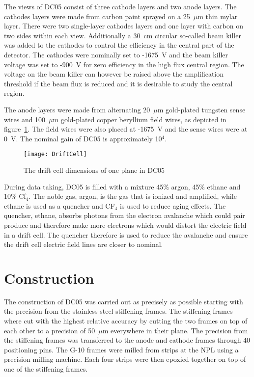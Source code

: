 The views of DC05 consist of three cathode layers and two anode layers.  The
cathodes layers were made from carbon paint sprayed on a 25~$\mu$m thin mylar
layer.  There were two single-layer cathodes layers and one layer with carbon on
two sides within each view.  Additionally a 30~cm circular so-called beam killer
was added to the cathodes to control the efficiency in the central part of the
detector.  The cathodes were nominally set to -1675~V and the beam killer
voltage was set to -900~V for zero efficiency in the high flux central region.
The voltage on the beam killer can however be raised above the amplification
threshold if the beam flux is reduced and it is desirable to study the central
region.

The anode layers were made from alternating 20~$\mu$m gold-plated tungsten sense
wires and 100~$\mu$m gold-plated copper beryllium field wires, as depicted in
figure~\ref{fig:driftcell}.  The field wires were also placed at -1675~V and the
sense wires were at 0~V.  The nominal gain of DC05 is approximately 10$^4$.

\begin{figure}
  \centering \texttt{[image: DriftCell]}
  \caption{}{The drift cell dimensions of one plane in DC05}
  \label{fig:driftcell}%
\end{figure}

During data taking, DC05 is filled with a mixture 45\% argon, 45\% ethane and
10\% Cf$_4$.  The noble gas, argon, is the gas that is ionized and amplified,
while ethane is used as a quencher and CF$_4$ is used to reduce aging effects.
The quencher, ethane, absorbs photons from the electron avalanche which could
pair produce and therefore make more electrons which would distort the electric
field in a drift cell.  The quencher therefore is used to reduce the avalanche
and ensure the drift cell electric field lines are closer to nominal.  


\section{Construction}
The construction of DC05 was carried out as precisely as possible starting with
the precision from the stainless steel stiffening frames.  The stiffening frames
where cut with the highest relative accuracy by cutting the two frames on top of
each other to a precision of 50~$\mu$m everywhere in their plane.  The precision
from the stiffening frames was transferred to the anode and cathode frames
through 40 positioning pins.  The G-10 frames were milled from strips at the NPL
using a precision milling machine.  Each four strips were then epoxied together
on top of one of the stiffening frames.

